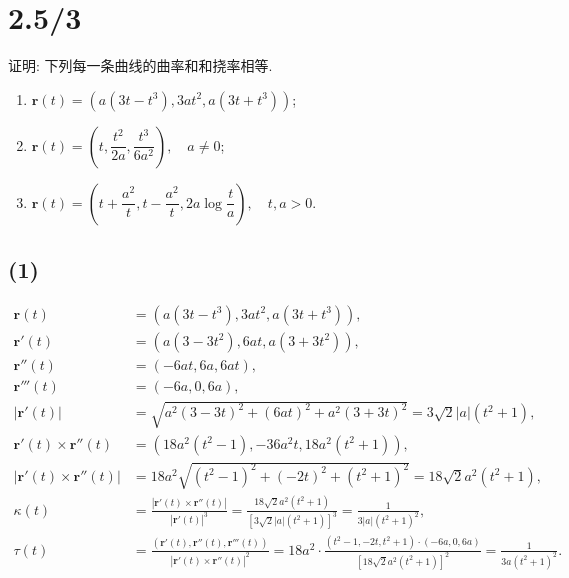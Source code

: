 \documentclass[11pt,a4paper]{article}
\author{刘逸灏 (515370910207)}
\begin{document}
\maketitle

\section{2.5/3}
\begin{problem}
  证明: 下列每一条曲线的曲率和和挠率相等.
  \begin{enumerate}
    \item $\mathbf{r}(t)=(a(3t-t^3),3at^2,a(3t+t^3))$;
    \item $\mathbf{r}(t)=\left(t,\dfrac{t^2}{2a},\dfrac{t^3}{6a^2}\right),\quad a\neq 0$;
    \item $\mathbf{r}(t)=\left(t+\dfrac{a^2}{t},t-\dfrac{a^2}{t},2a\log\dfrac{t}{a}\right),\quad t,a>0$.
  \end{enumerate}
\end{problem}

\subsection*{(1)}
\begin{align*}
  \mathbf{r}(t)                         & =(a(3t-t^3),3at^2,a(3t+t^3)),            \\
  \mathbf{r}'(t)                        & =(a(3-3t^2),6at,a(3+3t^2)),              \\
  \mathbf{r}''(t)                       & =(-6at,6a,6at),                          \\
  \mathbf{r}'''(t)                      & =(-6a,0,6a),                             \\
  |\mathbf{r}'(t)|                      & =\sqrt{a^2(3-3t)^2+(6at)^2+a^2(3+3t)^2}
  =3\sqrt{2}|a|(t^2+1),                                                            \\
  \mathbf{r}'(t)\times\mathbf{r}''(t)   &
  =(18a^2(t^2-1),-36a^2t,18a^2(t^2+1)),                                            \\
  |\mathbf{r}'(t)\times\mathbf{r}''(t)| & =18a^2\sqrt{(t^2-1)^2+(-2t)^2+(t^2+1)^2}
  =18\sqrt{2}a^2(t^2+1),                                                           \\
  \kappa(t)                             &
  =\frac{|\mathbf{r}'(t)\times\mathbf{r}''(t)|}{|\mathbf{r}'(t)|^3}
  =\frac{18\sqrt{2}a^2(t^2+1)}{[3\sqrt{2}|a|(t^2+1)]^3}=\frac{1}{3|a|(t^2+1)^2},   \\
  \tau(t)                               &
  =\frac{(\mathbf{r}'(t),\mathbf{r}''(t),\mathbf{r}'''(t))}{|\mathbf{r}'(t)\times\mathbf{r}''(t)|^2}=18a^2\cdot\frac{(t^2-1,-2t,t^2+1)\cdot(-6a,0,6a)}{[18\sqrt{2}a^2(t^2+1)]^2}=\frac{1}{3a(t^2+1)^2}.
\end{align*}
\end{document}

